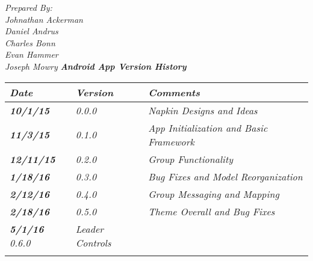{\color{SDColor5}
\noindent
\textit{Prepared By:}\\
\textit{Johnathan Ackerman}\\
\textit{Daniel Andrus}\\
\textit{Charles Bonn}\\
\textit{Evan Hammer}\\
\textit{Joseph Mowry}
}
\vfill
\noindent
{\color{SDColor3} \textit{\textbf{Android App Version History}}}\\
\begin{tabular}{|>{\raggedright}p{1.5cm}|>{\raggedright}p{1.5cm}|>{\raggedright}p{9cm}|}
\hline
\textit{\textbf{Date}} &  \textit{\textbf{Version}} & \textit{\textbf{Comments}}\tabularnewline
\hline
 \textit{\textbf{10/1/15}} & \textit{0.0.0} & \textit{Napkin Designs and Ideas}\tabularnewline
 \hline
  \textit{\textbf{11/3/15}} & \textit{0.1.0} & \textit{App Initialization and Basic Framework}\tabularnewline
 \hline
 \textit{\textbf{12/11/15}} & \textit{0.2.0} & \textit{Group Functionality}\tabularnewline
\hline
 \textit{\textbf{1/18/16}} & \textit{0.3.0} & \textit{Bug Fixes and Model Reorganization}\tabularnewline
\hline
 \textit{\textbf{2/12/16}} & \textit{0.4.0} & \textit{Group Messaging and Mapping}\tabularnewline
\hline
 \textit{\textbf{2/18/16}} & \textit{0.5.0} & \textit{Theme Overall and Bug Fixes}\tabularnewline
\hline
\textit{\textbf{5/1/16}} \textit{0.6.0} & \textit{Leader Controls}\tabularnewline
 &  & \tabularnewline
\hline
\end{tabular}
\vfill